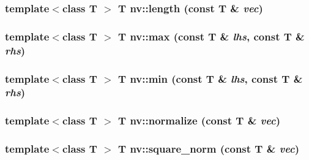 \hypertarget{namespacenv_e8621e0f559a4060f4376b8283237f2a}{
\subsubsection[{length}]{\setlength{\rightskip}{0pt plus 5cm}template$<$class T $>$ T nv::length (const T \& {\em vec})}}
\label{namespacenv_e8621e0f559a4060f4376b8283237f2a}


\hypertarget{namespacenv_06a746f1a320a378520c41744045808a}{
\subsubsection[{max}]{\setlength{\rightskip}{0pt plus 5cm}template$<$class T $>$ T nv::max (const T \& {\em lhs}, \/  const T \& {\em rhs})}}
\label{namespacenv_06a746f1a320a378520c41744045808a}


\hypertarget{namespacenv_d386b01e72b1573895911d11c8a8bc1f}{
\subsubsection[{min}]{\setlength{\rightskip}{0pt plus 5cm}template$<$class T $>$ T nv::min (const T \& {\em lhs}, \/  const T \& {\em rhs})}}
\label{namespacenv_d386b01e72b1573895911d11c8a8bc1f}


\hypertarget{namespacenv_4722b7c7e18ea4b7082ae015ed471f3e}{
\subsubsection[{normalize}]{\setlength{\rightskip}{0pt plus 5cm}template$<$class T $>$ T nv::normalize (const T \& {\em vec})}}
\label{namespacenv_4722b7c7e18ea4b7082ae015ed471f3e}


\hypertarget{namespacenv_4c16f1e337fc10195895f4da5c4de603}{
\subsubsection[{square\_\-norm}]{\setlength{\rightskip}{0pt plus 5cm}template$<$class T $>$ T nv::square\_\-norm (const T \& {\em vec})}}
\label{namespacenv_4c16f1e337fc10195895f4da5c4de603}


